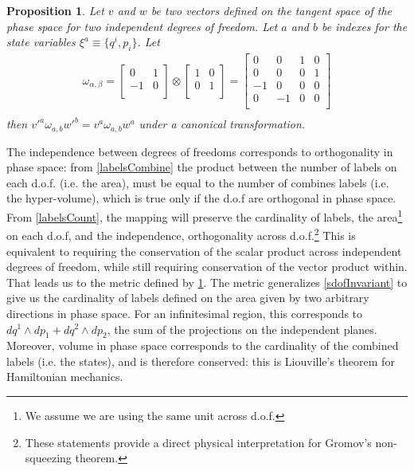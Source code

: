 \documentclass[aps,pra,10pt,twocolumn,floatfix,nofootinbib]{revtex4-1}
\newtheorem{prop}[thm]{Proposition}
\theoremstyle{definition}
\begin{document}
\begin{prop}\label{mdofInvariant}
Let $v$ and $w$ be two vectors defined on the tangent space of the phase space for two independent degrees of freedom. Let $a$ and $b$ be indexes for the state variables $\xi^a\equiv \{q^i, p_i\}$. Let
\begin{align*}
\omega_{\alpha, \beta} =  \left[
  \begin{array}{cc}
    0 & 1 \\
    -1 & 0 \\
  \end{array}
\right] \otimes \left[
  \begin{array}{cc}
    1 & 0 \\
    0 & 1 \\
  \end{array}
\right] =
\left[
  \begin{array}{cccc}
    0 & 0 & 1 & 0 \\
    0 & 0 & 0 & 1 \\
    -1 & 0 & 0 & 0 \\
    0 & -1 & 0 & 0 \\
  \end{array}
\right] \\
\end{align*}
then $v'^{a} \omega_{a, b} w'^{b}=v^{a} \omega_{a, b} w^{a}$ under a canonical transformation.
\end{prop}

The independence between degrees of freedoms corresponds to orthogonality in phase space: from \ref{labelsCombine} the product between the number of labels on each d.o.f. (i.e. the area), must be equal to the number of combines labels (i.e. the hyper-volume), which is true only if the d.o.f are orthogonal in phase space. From \ref{labelsCount}, the mapping will preserve the cardinality of labels, the area\footnote{We assume we are using the same unit across d.o.f.} on each d.o.f, and the independence, orthogonality across d.o.f.\footnote{These statements provide a direct physical interpretation for Gromov's non-squeezing theorem\cite{Gromov,deGosson,Stewart}.} This is equivalent to requiring the conservation of the scalar product across independent degrees of freedom, while still requiring conservation of the vector product within. That leads us to the metric defined by \ref{mdofInvariant}.
The metric generalizes \ref{sdofInvariant} to give us the cardinality of labels defined on the area given by two arbitrary directions in phase space. For an infinitesimal region, this corresponds to $dq^1 \wedge dp_1 + dq^2 \wedge dp_2$, the sum of the projections on the independent planes. Moreover, volume in phase space corresponds to the cardinality of the combined labels (i.e. the states), and is therefore conserved: this is Liouville's theorem for Hamiltonian mechanics.
\end{document}
